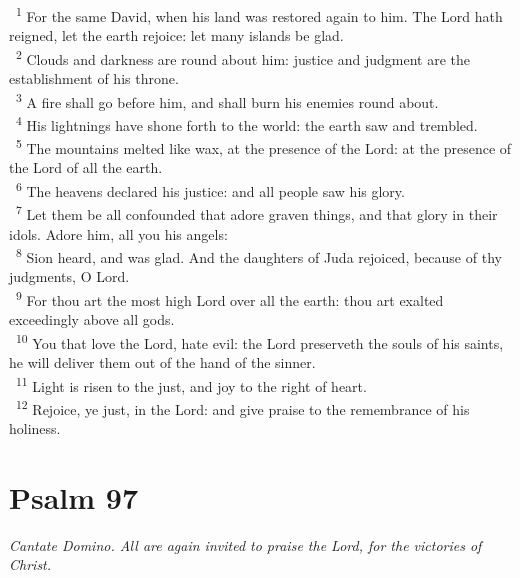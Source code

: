 \documentclass[a5paper,12pt]{article}
\begin{document}
\begin{multicols*}{2}
~\textsuperscript{1} For the same David, when his land was restored again to him. The Lord hath reigned, let the earth rejoice: let many islands be glad.\\
~\textsuperscript{2} Clouds and darkness are round about him: justice and judgment are the establishment of his throne.\\
~\textsuperscript{3} A fire shall go before him, and shall burn his enemies round about.\\
~\textsuperscript{4} His lightnings have shone forth to the world: the earth saw and trembled.\\
~\textsuperscript{5} The mountains melted like wax, at the presence of the Lord: at the presence of the Lord of all the earth.\\
~\textsuperscript{6} The heavens declared his justice: and all people saw his glory.\\
~\textsuperscript{7} Let them be all confounded that adore graven things, and that glory in their idols. Adore him, all you his angels:\\
~\textsuperscript{8} Sion heard, and was glad. And the daughters of Juda rejoiced, because of thy judgments, O Lord.\\
~\textsuperscript{9} For thou art the most high Lord over all the earth: thou art exalted exceedingly above all gods.\\
~\textsuperscript{10} You that love the Lord, hate evil: the Lord preserveth the souls of his saints, he will deliver them out of the hand of the sinner.\\
~\textsuperscript{11} Light is risen to the just, and joy to the right of heart.\\
~\textsuperscript{12} Rejoice, ye just, in the Lord: and give praise to the remembrance of his holiness.\\

\section{Psalm 97}
\label{sec:org5e83b58}
\emph{Cantate Domino. All are again invited to praise the Lord, for the victories of Christ.}\\


\end{multicols*}
\end{document}
